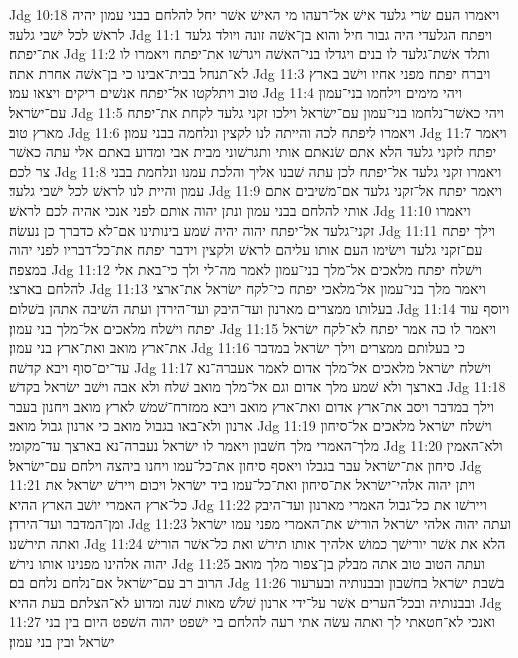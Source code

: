 Jdg 10:18  ויאמרו העם שׂרי גלעד אישׁ אל־רעהו מי האישׁ אשׁר יחל להלחם בבני עמון יהיה לראשׁ לכל ישׁבי גלעד׃
Jdg 11:1  ויפתח הגלעדי היה גבור חיל והוא בן־אשׁה זונה ויולד גלעד את־יפתח׃
Jdg 11:2  ותלד אשׁת־גלעד לו בנים ויגדלו בני־האשׁה ויגרשׁו את־יפתח ויאמרו לו לא־תנחל בבית־אבינו כי בן־אשׁה אחרת אתה׃
Jdg 11:3  ויברח יפתח מפני אחיו וישׁב בארץ טוב ויתלקטו אל־יפתח אנשׁים ריקים ויצאו עמו׃
Jdg 11:4  ויהי מימים וילחמו בני־עמון עם־ישׂראל׃
Jdg 11:5  ויהי כאשׁר־נלחמו בני־עמון עם־ישׂראל וילכו זקני גלעד לקחת את־יפתח מארץ טוב׃
Jdg 11:6  ויאמרו ליפתח לכה והייתה לנו לקצין ונלחמה בבני עמון׃
Jdg 11:7  ויאמר יפתח לזקני גלעד הלא אתם שׂנאתם אותי ותגרשׁוני מבית אבי ומדוע באתם אלי עתה כאשׁר צר לכם׃
Jdg 11:8  ויאמרו זקני גלעד אל־יפתח לכן עתה שׁבנו אליך והלכת עמנו ונלחמת בבני עמון והיית לנו לראשׁ לכל ישׁבי גלעד׃
Jdg 11:9  ויאמר יפתח אל־זקני גלעד אם־משׁיבים אתם אותי להלחם בבני עמון ונתן יהוה אותם לפני אנכי אהיה לכם לראשׁ׃
Jdg 11:10  ויאמרו זקני־גלעד אל־יפתח יהוה יהיה שׁמע בינותינו אם־לא כדברך כן נעשׂה׃
Jdg 11:11  וילך יפתח עם־זקני גלעד וישׂימו העם אותו עליהם לראשׁ ולקצין וידבר יפתח את־כל־דבריו לפני יהוה במצפה׃
Jdg 11:12  וישׁלח יפתח מלאכים אל־מלך בני־עמון לאמר מה־לי ולך כי־באת אלי להלחם בארצי׃
Jdg 11:13  ויאמר מלך בני־עמון אל־מלאכי יפתח כי־לקח ישׂראל את־ארצי בעלותו ממצרים מארנון ועד־היבק ועד־הירדן ועתה השׁיבה אתהן בשׁלום׃
Jdg 11:14  ויוסף עוד יפתח וישׁלח מלאכים אל־מלך בני עמון׃
Jdg 11:15  ויאמר לו כה אמר יפתח לא־לקח ישׂראל את־ארץ מואב ואת־ארץ בני עמון׃
Jdg 11:16  כי בעלותם ממצרים וילך ישׂראל במדבר עד־ים־סוף ויבא קדשׁה׃
Jdg 11:17  וישׁלח ישׂראל מלאכים אל־מלך אדום לאמר אעברה־נא בארצך ולא שׁמע מלך אדום וגם אל־מלך מואב שׁלח ולא אבה וישׁב ישׂראל בקדשׁ׃
Jdg 11:18  וילך במדבר ויסב את־ארץ אדום ואת־ארץ מואב ויבא ממזרח־שׁמשׁ לארץ מואב ויחנון בעבר ארנון ולא־באו בגבול מואב כי ארנון גבול מואב׃
Jdg 11:19  וישׁלח ישׂראל מלאכים אל־סיחון מלך־האמרי מלך חשׁבון ויאמר לו ישׂראל נעברה־נא בארצך עד־מקומי׃
Jdg 11:20  ולא־האמין סיחון את־ישׂראל עבר בגבלו ויאסף סיחון את־כל־עמו ויחנו ביהצה וילחם עם־ישׂראל׃
Jdg 11:21  ויתן יהוה אלהי־ישׂראל את־סיחון ואת־כל־עמו ביד ישׂראל ויכום ויירשׁ ישׂראל את כל־ארץ האמרי יושׁב הארץ ההיא׃
Jdg 11:22  ויירשׁו את כל־גבול האמרי מארנון ועד־היבק ומן־המדבר ועד־הירדן׃
Jdg 11:23  ועתה יהוה אלהי ישׂראל הורישׁ את־האמרי מפני עמו ישׂראל ואתה תירשׁנו׃
Jdg 11:24  הלא את אשׁר יורישׁך כמושׁ אלהיך אותו תירשׁ ואת כל־אשׁר הורישׁ יהוה אלהינו מפנינו אותו נירשׁ׃
Jdg 11:25  ועתה הטוב טוב אתה מבלק בן־צפור מלך מואב הרוב רב עם־ישׂראל אם־נלחם נלחם בם׃
Jdg 11:26  בשׁבת ישׂראל בחשׁבון ובבנותיה ובערעור ובבנותיה ובכל־הערים אשׁר על־ידי ארנון שׁלשׁ מאות שׁנה ומדוע לא־הצלתם בעת ההיא׃
Jdg 11:27  ואנכי לא־חטאתי לך ואתה עשׂה אתי רעה להלחם בי ישׁפט יהוה השׁפט היום בין בני ישׂראל ובין בני עמון׃

